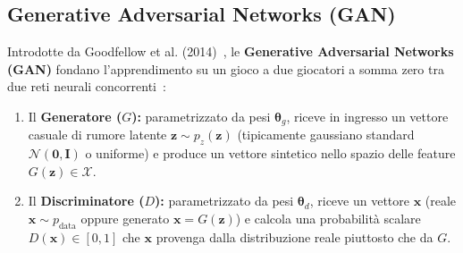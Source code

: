 \FloatBarrier
\subsection{Generative Adversarial Networks (GAN)}
\label{subsec:dm-gan}

Introdotte da Goodfellow et al. (2014)~\cite{goodfellow2014}, le \textbf{Generative Adversarial Networks (GAN)} fondano l'apprendimento su un gioco a due giocatori a somma zero tra due reti neurali concorrenti~\cite{mannocci2026imbalanced}:
\begin{enumerate}
    \item Il \textbf{Generatore ($G$):} parametrizzato da pesi $\boldsymbol{\theta}_g$, riceve in ingresso un vettore casuale di rumore latente $\mathbf{z} \sim p_z(\mathbf{z})$ (tipicamente gaussiano standard $\mathcal{N}(\mathbf{0}, \mathbf{I})$ o uniforme) e produce un vettore sintetico nello spazio delle feature $G(\mathbf{z}) \in \mathcal{X}$.
    \item Il \textbf{Discriminatore ($D$):} parametrizzato da pesi $\boldsymbol{\theta}_d$, riceve un vettore $\mathbf{x}$ (reale $\mathbf{x} \sim p_{\text{data}}$ oppure generato $\mathbf{x} = G(\mathbf{z})$) e calcola una probabilità scalare $D(\mathbf{x}) \in [0, 1]$ che $\mathbf{x}$ provenga dalla distribuzione reale piuttosto che da $G$.
\end{enumerate}

